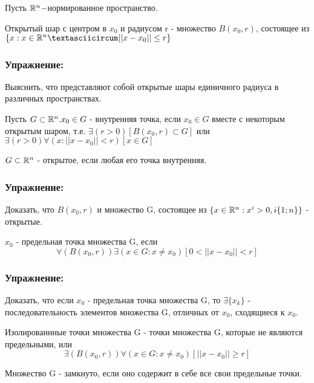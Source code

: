 Пусть $\mathbb{R}^n - $нормированное пространство.
\begin{opred}
Открытый шар с центром в $x_0$ и радиусом r - множество $B(x_0,r)$, состоящее из $\{x:x\in\R^n \textasciicircum ||x-x_0||\le r\}$
\end{opred}
\subsubsection{Упражнение:}
Выяснить, что представляют собой открытые шары единичного радиуса в различных пространствах.

\begin{opred}
Пусть $G\subset\mathbb{R}^n. x_0\in G$ - внутренняя точка, если $x_0\in G$ вместе с некоторым открытым шаром, т.е. $\exists(r>0)[B(x_0,r)\subset G]$ или
\\
$\exists(r>0)\forall(x:||x-x_0||<r)[x\in G]$
\end{opred}

\begin{opred}
$G\subset\mathbb{R}^n$ - открытое, если любая его точка внутренняя.
\end{opred}

\subsubsection{Упражнение:}
Доказать, что $B(x_0,r)$ и множество G, состоящее из $\{x\in\mathbb{R}^n:x^i>0,i\{1;n\}\}$ - открытые.

\begin{opred}
$x_0$ - предельная точка множества G, если 
$$
\forall(B(x_0,r))\exists(x\in G: x\ne x_0)[0<||x-x_0||<r]
$$
\end{opred}

\subsubsection{Упражнение:}
Доказать, что если $x_0$ - предельная точка множества G, то $\exists\{x_k\}$ - последовательность элементов множества G, отличных от $x_0$, сходящиеся к $x_0$.

\begin{opred}
Изолированнные точки множества G - точки множества G, которые не являются предельными, или 
$$
\exists(B(x_0,r))\forall(x\in G: x\ne x_0)[||x-x_0||\ge r]
$$
\end{opred}

\begin{opred}
Множество G - замкнуто, если оно содержит в себе все свои предельные точки.
\end{opred}

